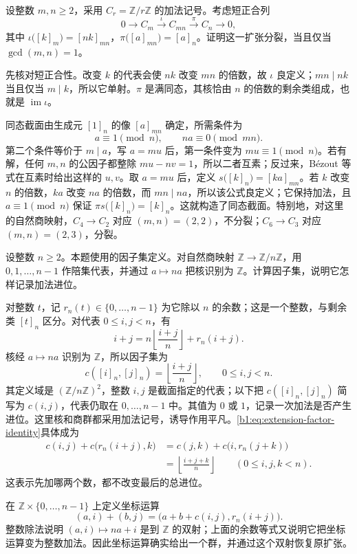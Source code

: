 \begin{exercise}\label{b1:ex:06-6}
	设整数 \(m,n\geq2\)，采用 \(C_r=\mathbb Z/r\mathbb Z\) 的加法记号。考虑短正合列
	\[
		0\longrightarrow C_m\xrightarrow{\iota}C_{mn}\xrightarrow{\pi}C_n\longrightarrow0,
	\]
	其中 \(\iota\bigl([k]_m\bigr)=[nk]_{mn}\)，\(\pi\bigl([a]_{mn}\bigr)=[a]_n\)。证明这一扩张分裂，当且仅当 \(\gcd(m,n)=1\)。
\end{exercise}
\begin{solution}
	先核对短正合性。改变 \(k\) 的代表会使 \(nk\) 改变 \(mn\) 的倍数，故 \(\iota\) 良定义；\(mn\mid nk\) 当且仅当 \(m\mid k\)，所以它单射。\(\pi\) 是满同态，其核恰由 \(n\) 的倍数的剩余类组成，也就是 \(\operatorname{im}\iota\)。

	同态截面由生成元 \([1]_n\) 的像 \([a]_{mn}\) 确定，所需条件为
	\[
		a\equiv1\pmod n,\qquad na\equiv0\pmod{mn}.
	\]
	第二个条件等价于 \(m\mid a\)，写 \(a=mu\) 后，第一条件变为 \(mu\equiv1\pmod n\)。若有解，任何 \(m,n\) 的公因子都整除 \(mu-nv=1\)，所以二者互素；反过来，Bézout 等式在互素时给出这样的 \(u,v\)。取 \(a=mu\) 后，定义 \(s\bigl([k]_n\bigr)=[ka]_{mn}\)。若 \(k\) 改变 \(n\) 的倍数，\(ka\) 改变 \(na\) 的倍数，而 \(mn\mid na\)，所以该公式良定义；它保持加法，且 \(a\equiv1\pmod n\) 保证 \(\pi s\bigl([k]_n\bigr)=[k]_n\)。这就构造了同态截面。特别地，对这里的自然商映射，\(C_4\rightarrow C_2\) 对应 \((m,n)=(2,2)\)，不分裂；\(C_6\rightarrow C_3\) 对应 \((m,n)=(2,3)\)，分裂。
\end{solution}

\begin{exercise}\label{b1:ex:06-7}
	设整数 \(n\geq2\)。本题使用的因子集定义。对自然商映射 \(\mathbb Z\rightarrow\mathbb Z/n\mathbb Z\)，用 \(0,1,\ldots,n-1\) 作陪集代表，并通过 \(a\mapsto na\) 把核识别为 \(\mathbb Z\)。计算因子集，说明它怎样记录加法进位。
\end{exercise}
\begin{solution}
	对整数 \(t\)，记 \(r_n(t)\in\{0,\ldots,n-1\}\) 为它除以 \(n\) 的余数；这是一个整数，与剩余类 \([t]_n\) 区分。对代表 \(0\leq i,j<n\)，有
	\[
		i+j=n\left\lfloor\frac{i+j}{n}\right\rfloor+r_n(i+j).
	\]
	核经 \(a\mapsto na\) 识别为 \(\mathbb Z\)，所以因子集为
	\[
		c([i]_n,[j]_n)=\left\lfloor\frac{i+j}{n}\right\rfloor, \qquad 0\leq i,j<n.
	\]
	其定义域是 \((\mathbb Z/n\mathbb Z)^2\)，整数 \(i,j\) 是截面指定的代表；以下把 \(c([i]_n,[j]_n)\) 简写为 \(c(i,j)\)，代表仍取在 \(0,\ldots,n-1\) 中。其值为 \(0\) 或 \(1\)，记录一次加法是否产生进位。这里核和商群都采用加法记号，诱导作用平凡。\eqref{b1:eq:extension-factor-identity}具体成为
	\[
		\begin{aligned}
			c(i,j)+c\bigl(r_n(i+j),k\bigr) &=c(j,k)+c\bigl(i,r_n(j+k)\bigr)\\
			&=\left\lfloor\frac{i+j+k}{n}\right\rfloor \qquad(0\leq i,j,k<n).
		\end{aligned}
	\]
	这表示先加哪两个数，都不改变最后的总进位。

	在 \(\mathbb Z\times\{0,\ldots,n-1\}\) 上定义坐标运算
	\[
		(a,i)+(b,j)=\bigl(a+b+c(i,j),r_n(i+j)\bigr).
	\]
	整数除法说明 \((a,i)\mapsto na+i\) 是到 \(\mathbb Z\) 的双射；上面的余数等式又说明它把坐标运算变为整数加法。因此坐标运算确实给出一个群，并通过这个双射恢复原扩张。
\end{solution}

